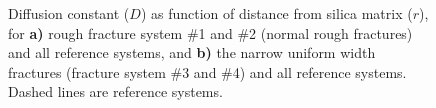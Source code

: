 \begin{figure}[htpb]%
\setlength{\myfigwidth}{0.58\textwidth}%
\makebox[\textwidth][c]{ %
    \begin{minipage}[t]{\myfigwidth}%
        \centering%
        \subcaption{\label{fig:diffusion_normal_and_reference}}%
    \end{minipage}%
    \hfill%
    \begin{minipage}[t]{\myfigwidth}%
        \centering%
        \subcaption{\label{fig:diffusion_narrow_and_reference}}%
    \end{minipage}%
}%
\caption{%
    Diffusion constant ($D$) as function of distance from silica matrix ($r$), for \textbf{a)} rough fracture system \#1 and \#2 (normal rough fractures) and all reference systems, and \textbf{b)} the narrow uniform width fractures (fracture system \#3 and \#4) and all reference systems. Dashed lines are reference systems. %
}%
\end{figure}%

% 


